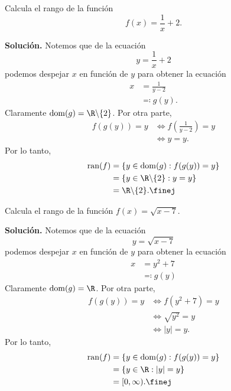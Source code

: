 \documentclass[12pt,a4paper]{book}
\DeclareMathOperator{\dom}{dom}
\DeclareMathOperator{\ran}{ran}
\begin{document}
    \begin{ejemplo}\label{ejm:30}
        Calcula el rango de la función
        \begin{equation*}
            f(x)=\frac{1}{x}+2.
        \end{equation*}

        \textbf{Solución.} Notemos que de la ecuación
        \begin{equation*}
            y=\frac{1}{x}+2
        \end{equation*}
        podemos despejar $x$ en función de $y$ para obtener la ecuación
        \begin{align*}
            x&=\frac{1}{y-2}\\
            &\eqqcolon g(y).
        \end{align*}
        Claramente $\dom(g)=\R\backslash\{2\}$. Por otra parte,
        \begin{align*}
            f(g(y))=y&\Leftrightarrow f\left(\frac{1}{y-2}\right)=y\\
            &\Leftrightarrow y=y.
        \end{align*}
        Por lo tanto,
        \begin{align*}
            \ran(f)&=\{y\in\dom(g):f(g(y))=y\}\\
            &=\{y\in\R\backslash\{2\}:y=y\}\\
            &=\R\backslash\{2\}.\finej
        \end{align*}
    \end{ejemplo}

    \begin{ejemplo}\label{ejm:31}
        Calcula el rango de la función $f(x)=\sqrt{x-7}$.

        \textbf{Solución.} Notemos que de la ecuación
        \begin{equation*}
            y=\sqrt{x-7}
        \end{equation*}
        podemos despejar $x$ en función de $y$ para obtener la ecuación
        \begin{align*}
            x&=y^{2}+7\\
            &\eqqcolon g(y)
        \end{align*}
        Claramente $\dom(g)=\R$. Por otra parte,
        \begin{align*}
            f(g(y))=y&\Leftrightarrow f\left(y^{2}+7\right)=y\\
            &\Leftrightarrow\sqrt{y^{2}}=y\\
            &\Leftrightarrow|y|=y.
        \end{align*}
        Por lo tanto,
        \begin{align*}
            \ran(f)&=\{y\in\dom(g):f(g(y))=y\}\\
            &=\{y\in\R:|y|=y\}\\
            &=[0,\infty).\finej
        \end{align*}
    \end{ejemplo}
\end{document}
